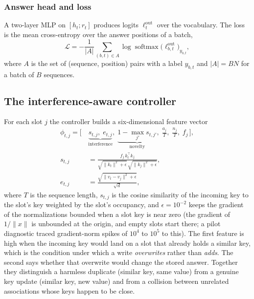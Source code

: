 \documentclass[conference]{IEEEtran}
\DeclareMathOperator*{\softmax}{softmax}
\begin{document}
\subsubsection{Answer head and loss}
A two-layer MLP on $[h_t ; r_t]$ produces logits $\ell^{\text{out}}_t$ over the
vocabulary. The loss is the mean cross-entropy over the answer positions of a
batch,
\begin{equation}
\mathcal{L} = -\frac{1}{|A|}\sum_{(b,t) \in A} \log \softmax\big(\ell^{\text{out}}_{b,t}\big)_{y_{b,t}},
\label{eq:loss}
\end{equation}
where $A$ is the set of (sequence, position) pairs with a label $y_{b,t}$ and
$|A| = BN$ for a batch of $B$ sequences.

\subsection{The interference-aware controller}
\label{sec:controller}

For each slot $j$ the controller builds a six-dimensional feature vector
\begin{equation}
\begin{split}
\phi_{t,j} = \Big[\,
&\underbrace{s_{t,j},\; e_{t,j}}_{\text{interference}},\;
\underbrace{1 - \max_{j'} s_{t,j'}}_{\text{novelty}},\;
\tfrac{a_j}{T},\; \tfrac{n_j}{T},\; f_j \,\Big],\\
s_{t,j} &= \frac{f_j\, k_t^\top k_j}{\sqrt{\lVert k_t\rVert^2 + \epsilon}\,\sqrt{\lVert k_j\rVert^2 + \epsilon}},\\
e_{t,j} &= \frac{\sqrt{\lVert v_t - v_j\rVert^2 + \epsilon}}{\sqrt{d}},
\end{split}
\label{eq:features}
\end{equation}
where $T$ is the sequence length, $s_{t,j}$ is the cosine similarity of the
incoming key to the slot's key weighted by the slot's occupancy, and
$\epsilon = 10^{-2}$ keeps the gradient of the normalizations bounded when a
slot key is near zero (the gradient of $1/\lVert x\rVert$ is unbounded at the
origin, and empty slots start there; a pilot diagnostic traced gradient-norm
spikes of $10^4$ to $10^5$ to this). The first feature is high when the incoming
key would land on a slot that already holds a similar key, which is the
condition under which a write \emph{overwrites} rather than \emph{adds}. The
second says whether that overwrite would change the stored answer. Together they
distinguish a harmless duplicate (similar key, same value) from a genuine key
update (similar key, new value) and from a collision between unrelated
associations whose keys happen to be close.
\end{document}
